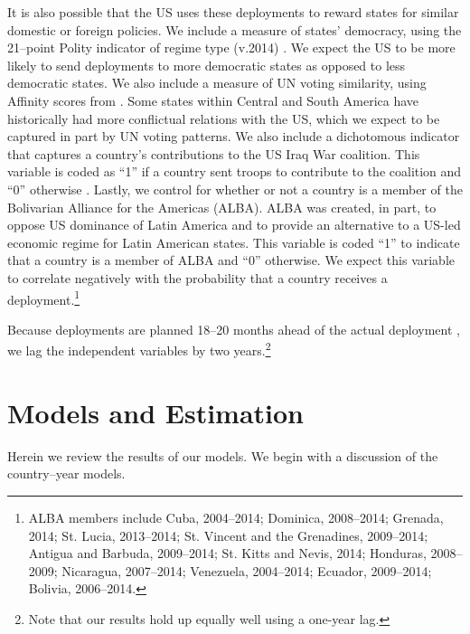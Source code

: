 \documentclass[12pt]{article}
\begin{document}
\begin{doublespace}
It is also possible that the US uses these deployments to reward states for similar domestic or foreign policies. We include a measure of states' democracy, using the 21--point Polity indicator of regime type (v.2014) \cite{MarshallJaggersGurr2011}. We expect the US to be more likely to send deployments to more democratic states as opposed to less democratic states. We also include a measure of UN voting similarity, using Affinity scores from . Some states within Central and South America have historically had more conflictual relations with the US, which we expect to be captured in part by UN voting patterns.  We also include a dichotomous indicator that captures a country's contributions to the US Iraq War coalition. This variable is coded as ``1'' if a country sent troops to contribute to the coalition and ``0'' otherwise \cite{Carney2011}. Lastly, we control for whether or not a country is a member of the Bolivarian Alliance for the Americas (ALBA). ALBA was created, in part, to oppose US dominance of Latin America and to provide an alternative to a US-led economic regime for Latin American states. This variable is coded ``1'' to indicate that a country is a member of ALBA and ``0'' otherwise. We expect this variable to correlate negatively with the probability that a country receives a deployment.\footnote{ALBA members include Cuba, 2004--2014; Dominica, 2008--2014; Grenada, 2014; St. Lucia, 2013--2014; St. Vincent and the Grenadines, 2009--2014; Antigua and Barbuda, 2009--2014; St. Kitts and Nevis, 2014; Honduras, 2008--2009; Nicaragua, 2007--2014; Venezuela, 2004--2014; Ecuador, 2009--2014; Bolivia, 2006--2014.}

Because deployments are planned 18--20 months ahead of the actual deployment \cite{CPT20160309}, we lag the independent variables by two years.\footnote{Note that our results hold up equally well using a one-year lag.}





\section{Models and Estimation}

Herein we review the results of our models. We begin with a discussion of the country--year models. 



\end{doublespace}
\end{document}
